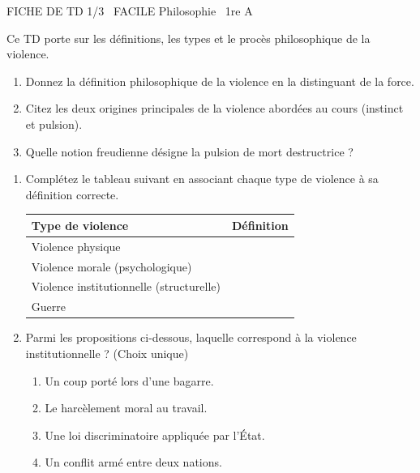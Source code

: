 \documentclass[11pt]{article}
\begin{document}
\begin{tcolorbox}[enhanced,colback=popink,colframe=popink,arc=10pt,boxrule=0pt,left=12pt,right=12pt,top=9pt,bottom=9pt]
{\color{white}\popxbold\small FICHE DE TD 1/3 \textbullet\ FACILE \hfill Philosophie \textbullet\ 1re A\par}
\end{tcolorbox}
\vspace{4pt}
Ce TD porte sur les définitions, les types et le procès philosophique de la violence.

\begin{exercice}
\begin{enumerate}
    \item Donnez la définition philosophique de la violence en la distinguant de la force.
    \item Citez les deux origines principales de la violence abordées au cours (instinct et pulsion).
    \item Quelle notion freudienne désigne la pulsion de mort destructrice ?
\end{enumerate}
\end{exercice}

\begin{exercice}
\begin{enumerate}
    \item Complétez le tableau suivant en associant chaque type de violence à sa définition correcte.
    
    \begin{tabular}{|p{3.5cm}|p{11cm}|}
    \hline
    \textbf{Type de violence} & \textbf{Définition} \\
    \hline
    Violence physique & \\
    \hline
    Violence morale (psychologique) & \\
    \hline
    Violence institutionnelle (structurelle) & \\
    \hline
    Guerre & \\
    \hline
    \end{tabular}
    
    \item Parmi les propositions ci-dessous, laquelle correspond à la violence institutionnelle ? (Choix unique)
    \begin{enumerate}
        \item Un coup porté lors d'une bagarre.
        \item Le harcèlement moral au travail.
        \item Une loi discriminatoire appliquée par l'État.
        \item Un conflit armé entre deux nations.
    \end{enumerate}
\end{enumerate}
\end{exercice}
\end{document}

